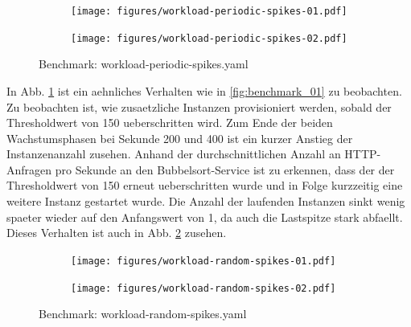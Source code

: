 \documentclass[runningheads]{llncs}
\begin{document}
\begin{figure}
	\centering
	\begin{subfigure}{.5\textwidth}
		\centering
		\texttt{[image: figures/workload-periodic-spikes-01.pdf]}
	\end{subfigure}%
	\begin{subfigure}{.5\textwidth}
		\centering
		\texttt{[image: figures/workload-periodic-spikes-02.pdf]}
	\end{subfigure}
	\caption{Benchmark: workload-periodic-spikes.yaml}
	\label{fig:benchmark_02}
\end{figure}	

In Abb. \ref{fig:benchmark_02} ist ein aehnliches Verhalten wie in  \ref{fig:benchmark_01} zu beobachten. Zu beobachten ist, wie zusaetzliche Instanzen provisioniert werden, sobald der Thresholdwert von 150 ueberschritten wird. Zum Ende der beiden Wachstumsphasen bei Sekunde 200 und 400 ist ein kurzer Anstieg der Instanzenanzahl zusehen. Anhand der durchschnittlichen Anzahl an HTTP-Anfragen pro Sekunde an den Bubbelsort-Service ist zu erkennen, dass der der Thresholdwert von 150 erneut ueberschritten wurde und in Folge  kurzzeitig eine weitere Instanz gestartet wurde. Die Anzahl der laufenden Instanzen sinkt wenig spaeter wieder auf den Anfangswert von 1, da auch die Lastspitze stark abfaellt. Dieses Verhalten ist auch in Abb. \ref{fig:benchmark_03} zusehen.

\begin{figure}
	\centering
	\begin{subfigure}{.5\textwidth}
		\centering
		\texttt{[image: figures/workload-random-spikes-01.pdf]}
	\end{subfigure}%
	\begin{subfigure}{.5\textwidth}
		\centering
		\texttt{[image: figures/workload-random-spikes-02.pdf]}
	\end{subfigure}
	\caption{Benchmark: workload-random-spikes.yaml}
	\label{fig:benchmark_03}
\end{figure}
\end{document}
